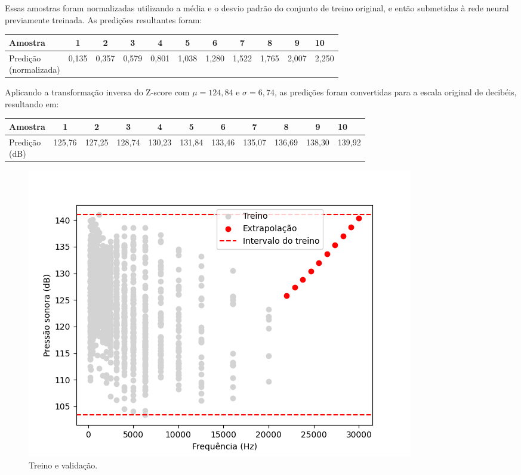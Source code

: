 \documentclass[12pt,a4paper,oneside]{report}
\begin{document}
Essas amostras foram normalizadas utilizando a média e o desvio padrão do conjunto de treino original, e então submetidas à rede neural previamente treinada. As predições resultantes foram:

\begin{center}
	\small{
	\begin{tabular}{l|c c c c c c c c c l}
		\textbf{Amostra} & 1 & 2 & 3 & 4 & 5 & 6 & 7 & 8 & 9 & 10 \\ \hline
		\thead{Predição \\(normalizada)}  & 0,135 & 0,357 & 0,579 & 0,801 
		& 1,038 & 1,280 & 1,522 & 1,765 & 2,007 & 2,250 \\
	\end{tabular}
}
\end{center}

Aplicando a transformação inversa do Z-score com $\mu = 124{,}84$ e $\sigma = 6{,}74$, as predições foram convertidas para a escala original de decibéis, resultando em:

\begin{center}
	\small{
	\begin{tabular}{l|c c c c c c c c c l} 
		\textbf{Amostra} & 1 & 2 & 3 & 4 & 5 & 6 & 7 & 8 & 9 & 10 \\ \hline
		\thead{Predição \\(dB)}  & 125{,}76 & 127{,}25 & 128{,}74 & 130{,}23
		& 131{,}84 & 133{,}46 & 135{,}07 & 136{,}69 & 138{,}30 & 139{,}92  \\
	\end{tabular}
}
\end{center}

\begin{figure}[h!]
	\centering
	\includegraphics[width=0.7\linewidth]{img/extrapolacao.png}
	\caption{Treino e validação.}
	\label{fig:extrapolacao}
\end{figure}
\end{document}
